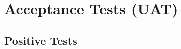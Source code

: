 \documentclass[12pt,a4paper]{article}
\begin{document}

\newpage
\section{Acceptance Tests (UAT)}
 
\subsection*{Positive Tests}
 
\end{document}
